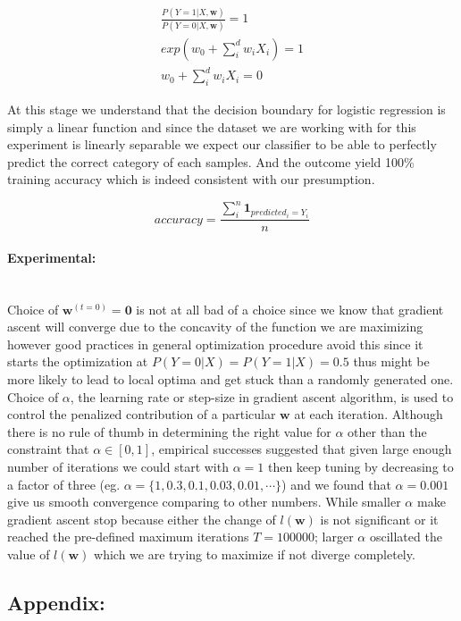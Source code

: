\documentclass[a4paper]{article}
\begin{document}
	\begin{align}
		\frac{P(Y=1|X, \mathbf{w})}{P(Y=0|X, \mathbf{w})} = 1 \\ 
		exp(w_0 + \sum_i^d w_iX_i) = 1 \\ 
		w_0 + \sum_i^d w_iX_i = 0
	\end{align}
	
	At this stage we understand that the decision boundary for logistic regression is simply a linear function and since the dataset we are working with for this experiment is linearly separable we expect our classifier to be able to perfectly predict the correct category of each samples. And the outcome yield 100\% training accuracy which is indeed consistent with our presumption.
	
	\begin{equation}
		accuracy = \frac{\sum_i^n \mathbf{1}_{predicted_i = Y_i}}{n}
	\end{equation}
	
\paragraph{Experimental:} ~\\

 	Choice of $\mathbf{w}^{(t=0)} = \mathbf{0}$ is not at all bad of a choice since we know that gradient ascent will converge due to the concavity of the function we are maximizing however good practices in general optimization procedure avoid this since it starts the optimization at $P(Y=0|X) = P(Y=1|X) = 0.5$ thus might be more likely to lead to local optima and get stuck than a randomly generated one. \\
	
	Choice of $\alpha$, the learning rate or step-size in gradient ascent algorithm, is used to control the penalized contribution of a particular $\mathbf{w}$ at each iteration. Although there is no rule of thumb in determining the right value for $\alpha$ other than the constraint that $\alpha \in [0,1]$, empirical successes suggested that given large enough number of iterations we could start with $\alpha = 1$ then keep tuning by decreasing to a factor of three (eg. $\alpha = \{1, 0.3, 0.1, 0.03, 0.01, \cdots \}$) and we found that $\alpha = 0.001$ give us smooth convergence comparing to other numbers. While smaller $\alpha$ make gradient ascent stop because either the change of $l(\mathbf{w})$ is not significant or it reached the pre-defined maximum iterations $T=100000$; larger $\alpha$ oscillated the value of $l(\mathbf{w})$ which we are trying to maximize if not diverge completely.
\newpage
\subsection*{Appendix:}
	
	
	
\end{document}
